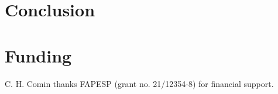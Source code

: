\documentclass[%
reprint,
nofootinbib,
 amsmath,amssymb,
aps,
superscriptaddress,
showkeys,
longbibliography
]{revtex4-1}
\begin{document}
\section{Conclusion}
\label{s:conclusion}




\section*{Funding}
C. H. Comin thanks FAPESP (grant no. 21/12354-8) for financial support. 



\end{document}
